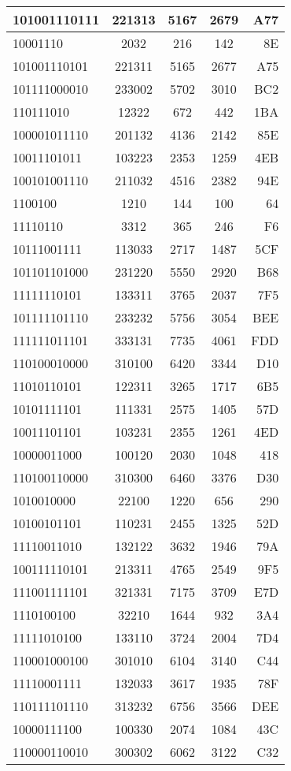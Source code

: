\documentclass[12pt]{article}
\begin{document}
\begin{center}
\begin{tabular}{||l|c|c|c|r||}
101001110111 & 221313 & 5167 & 2679 & A77 \\ \hline
10001110 & 2032 & 216 & 142 & 8E \\ \hline
101001110101 & 221311 & 5165 & 2677 & A75 \\ \hline
101111000010 & 233002 & 5702 & 3010 & BC2 \\ \hline
110111010 & 12322 & 672 & 442 & 1BA \\ \hline
100001011110 & 201132 & 4136 & 2142 & 85E \\ \hline
10011101011 & 103223 & 2353 & 1259 & 4EB \\ \hline
100101001110 & 211032 & 4516 & 2382 & 94E \\ \hline
1100100 & 1210 & 144 & 100 & 64 \\ \hline
11110110 & 3312 & 365 & 246 & F6 \\ \hline
10111001111 & 113033 & 2717 & 1487 & 5CF \\ \hline
101101101000 & 231220 & 5550 & 2920 & B68 \\ \hline
11111110101 & 133311 & 3765 & 2037 & 7F5 \\ \hline
101111101110 & 233232 & 5756 & 3054 & BEE \\ \hline
111111011101 & 333131 & 7735 & 4061 & FDD \\ \hline
110100010000 & 310100 & 6420 & 3344 & D10 \\ \hline
11010110101 & 122311 & 3265 & 1717 & 6B5 \\ \hline
10101111101 & 111331 & 2575 & 1405 & 57D \\ \hline
10011101101 & 103231 & 2355 & 1261 & 4ED \\ \hline
10000011000 & 100120 & 2030 & 1048 & 418 \\ \hline
110100110000 & 310300 & 6460 & 3376 & D30 \\ \hline
1010010000 & 22100 & 1220 & 656 & 290 \\ \hline
10100101101 & 110231 & 2455 & 1325 & 52D \\ \hline
11110011010 & 132122 & 3632 & 1946 & 79A \\ \hline
100111110101 & 213311 & 4765 & 2549 & 9F5 \\ \hline
111001111101 & 321331 & 7175 & 3709 & E7D \\ \hline
1110100100 & 32210 & 1644 & 932 & 3A4 \\ \hline
11111010100 & 133110 & 3724 & 2004 & 7D4 \\ \hline
110001000100 & 301010 & 6104 & 3140 & C44 \\ \hline
11110001111 & 132033 & 3617 & 1935 & 78F \\ \hline
110111101110 & 313232 & 6756 & 3566 & DEE \\ \hline
10000111100 & 100330 & 2074 & 1084 & 43C \\ \hline
110000110010 & 300302 & 6062 & 3122 & C32 \\ \hline

\end{tabular}
\end{center}
\end{document}

